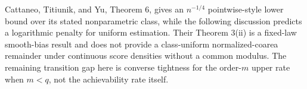 Cattaneo, Titiunik, and Yu, Theorem 6, gives an \(n^{-1/4}\) pointwise-style lower bound over its stated nonparametric class, while the following discussion predicts a logarithmic penalty for uniform estimation.  Their Theorem 3(ii) is a fixed-law smooth-bias result and does not provide a class-uniform normalized-coarea remainder under continuous score densities without a common modulus.  The remaining transition gap here is converse tightness for the order-\(m\) upper rate when \(m<q\), not the achievability rate itself.
